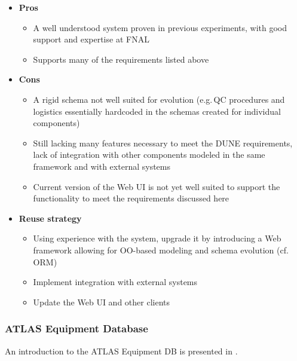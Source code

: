 \documentclass[pdftex,12pt,letter]{article}
\begin{document}
\begin{itemize}

\item \textbf{Pros}
\begin{itemize}
\item A well understood system proven in previous experiments, with good support and expertise at FNAL
\item Supports many of the requirements listed above
\end{itemize}

\item \textbf{Cons}
\begin{itemize}
\item A rigid schema not well suited for evolution (e.g.\,QC procedures and logistics essentially hardcoded in the schemas
created for individual components)
\item Still lacking many features necessary to meet the DUNE requirements, lack of integration with other components
modeled in the same framework and with external systems
\item Current version of the Web UI is not yet well suited to support the functionality to meet the requirements discussed here
\end{itemize}

\item \textbf{Reuse strategy}
\begin{itemize}
\item Using experience with the system, upgrade it by introducing a Web framework allowing for OO-based modeling and schema evolution (cf.\,ORM)
\item Implement integration with external systems
\item Update the Web UI and other clients
\end{itemize}


\end{itemize}

\subsubsection{ATLAS Equipment Database}

An introduction to the ATLAS Equipment DB is presented in \cite{atlasequipmentdb}.
\end{document}
